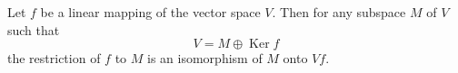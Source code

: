 Let $f$ be a linear mapping of the vector space $V$. Then for any subspace $M$ of $V$ such that
$$
V = M \oplus \operatorname{Ker} f
$$
the restriction of $f$ to $M$ is an isomorphism of $M$ onto $Vf$.
